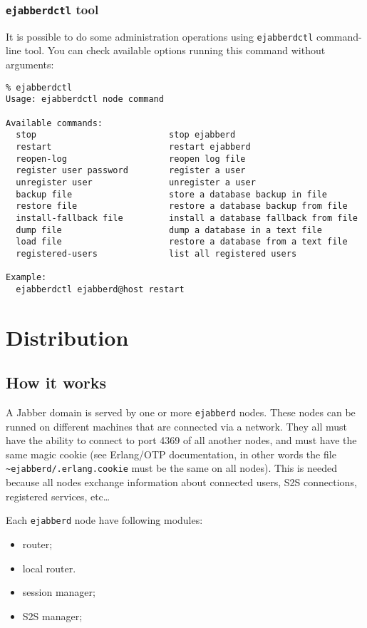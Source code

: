\documentclass[a4paper,10pt]{article}
\newcommand{\term}[1]{\texttt{#1}}
\newcommand{\ejabberd}{\texttt{ejabberd}}
\newcommand{\Jabber}{Jabber}
\begin{document}
\subsubsection{\term{ejabberdctl} tool}
\label{sec:ejabberdctl}

It is possible to do some administration operations using \term{ejabberdctl}
command-line tool.  You can check available options running this command
without arguments:
\begin{verbatim}
% ejabberdctl
Usage: ejabberdctl node command

Available commands:
  stop                          stop ejabberd
  restart                       restart ejabberd
  reopen-log                    reopen log file
  register user password        register a user
  unregister user               unregister a user
  backup file                   store a database backup in file
  restore file                  restore a database backup from file
  install-fallback file         install a database fallback from file
  dump file                     dump a database in a text file
  load file                     restore a database from a text file
  registered-users              list all registered users

Example:
  ejabberdctl ejabberd@host restart
\end{verbatim}



\section{Distribution}
\label{sec:distribution}


\subsection{How it works}
\label{sec:howitworks}

A \Jabber{} domain is served by one or more \ejabberd{} nodes.  These nodes can
be runned on different machines that are connected via a network.  They all
must have the ability to connect to port 4369 of all another nodes, and must
have the same magic cookie (see Erlang/OTP documentation, in other words the
file \term{\~{}ejabberd/.erlang.cookie} must be the same on all nodes). This is
needed because all nodes exchange information about connected users, S2S
connections, registered services, etc\ldots

Each \ejabberd{} node have following modules:
\begin{itemize}
\item router;
\item local router.
\item session manager;
\item S2S manager;
\end{itemize}
\end{document}

